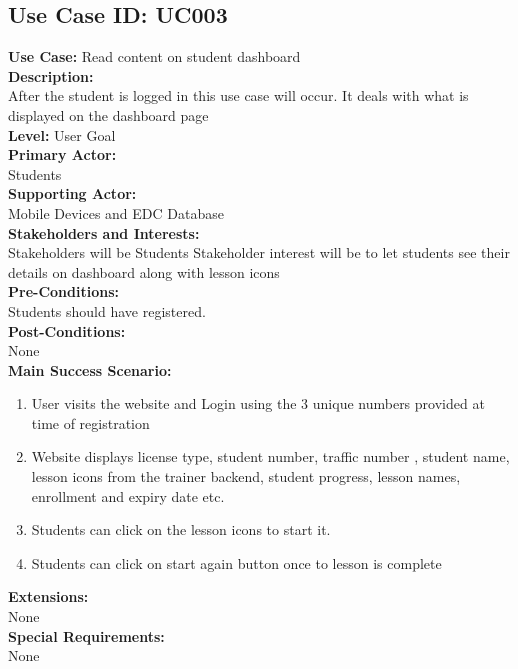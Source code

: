 \documentclass{report}
\begin{document}
\subsection{\textbf{Use Case ID:} UC003}
\textbf{Use Case:} Read content on student dashboard\\[0.3cm]
\textbf{Description:}\\
After the student is logged in this use case will occur. It deals with what is displayed on the dashboard page\\[0.3cm]
\textbf{Level:} User Goal\\[0.3cm]
\textbf{Primary Actor:}\\
Students\\[0.3cm]
\textbf{Supporting Actor:}\\
Mobile Devices and EDC Database\\[0.3cm]
\textbf{Stakeholders and Interests:}\\
Stakeholders will be Students
Stakeholder interest will be to let students see their details on dashboard along with lesson icons\\[0.3cm]
\textbf{Pre-Conditions:}\\
Students should have registered.\\[0.3cm]
\textbf{Post-Conditions:}\\
None\\[0.3cm]
\textbf{\large {Main Success Scenario:}}
\begin{enumerate}
    \item User visits the website and Login using the 3 unique numbers provided at time of registration
    \item Website displays license type, student number, traffic number , student name, lesson icons from the trainer backend, student progress, lesson names, enrollment and expiry date etc.
    \item Students can click on the lesson icons to start it.
    \item Students can click on start again button once to lesson is complete
\end{enumerate}
\textbf{Extensions:}\\
None\\[0.3cm]
\textbf{Special Requirements:}\\
None\\
\end{document}
